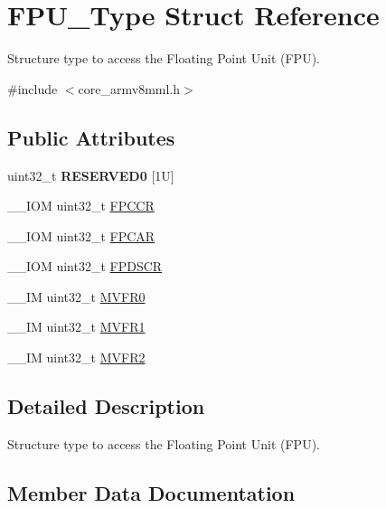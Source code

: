 \hypertarget{struct_f_p_u___type}{}\section{F\+P\+U\+\_\+\+Type Struct Reference}
\label{struct_f_p_u___type}


Structure type to access the Floating Point Unit (F\+PU).  




{\ttfamily \#include $<$core\+\_\+armv8mml.\+h$>$}

\subsection*{Public Attributes}
\begin{DoxyCompactItemize}
\item 
\mbox{\label{struct_f_p_u___type_aeab77b3f17bf5a628cb743807d8fde7e}} 
uint32\+\_\+t {\bfseries R\+E\+S\+E\+R\+V\+E\+D0} \mbox{[}1\+U\mbox{]}
\item 
\+\_\+\+\_\+\+I\+OM uint32\+\_\+t \mbox{\hyperlink{struct_f_p_u___type_af1b708c5e413739150df3d16ca3b7061}{F\+P\+C\+CR}}
\item 
\+\_\+\+\_\+\+I\+OM uint32\+\_\+t \mbox{\hyperlink{struct_f_p_u___type_a55263b468d0f8e11ac77aec9ff87c820}{F\+P\+C\+AR}}
\item 
\+\_\+\+\_\+\+I\+OM uint32\+\_\+t \mbox{\hyperlink{struct_f_p_u___type_a58d1989664a06db6ec2e122eefa9f04a}{F\+P\+D\+S\+CR}}
\item 
\+\_\+\+\_\+\+IM uint32\+\_\+t \mbox{\hyperlink{struct_f_p_u___type_a4f19014defe6033d070b80af19ef627c}{M\+V\+F\+R0}}
\item 
\+\_\+\+\_\+\+IM uint32\+\_\+t \mbox{\hyperlink{struct_f_p_u___type_a66f8cfa49a423b480001a4e101bf842d}{M\+V\+F\+R1}}
\item 
\+\_\+\+\_\+\+IM uint32\+\_\+t \mbox{\hyperlink{struct_f_p_u___type_a479130e53a8b3c36fd8ee38b503a3911}{M\+V\+F\+R2}}
\end{DoxyCompactItemize}


\subsection{Detailed Description}
Structure type to access the Floating Point Unit (F\+PU). 

\subsection{Member Data Documentation}
\mbox{\label{struct_f_p_u___type_a55263b468d0f8e11ac77aec9ff87c820}} 
